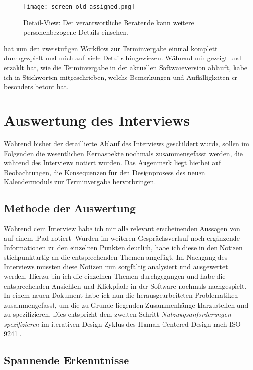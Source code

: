\begin{figure}[H]
    \caption{Detail-View: Der verantwortliche Beratende kann weitere personenbezogene Details einsehen.}
    \centering
    \texttt{[image: screen\_old\_assigned.png]}
\end{figure}

\ipName hat nun den zweistufigen Workflow zur Terminvergabe einmal komplett
durchgespielt und mich auf viele Details hingewiesen. Während \ipName mir
gezeigt und erzählt hat, wie die Terminvergabe in der aktuellen Softwareversion
abläuft, habe ich in Stichworten mitgeschrieben, welche Bemerkungen und
Auffälligkeiten er besonders betont hat.

\section{Auswertung des Interviews}

Während bisher der detaillierte Ablauf des Interviews geschildert wurde, sollen
im Folgenden die wesentlichen Kernaspekte nochmals zusammengefasst werden, die
während des Interviews notiert wurden. Das Augenmerk liegt hierbei auf
Beobachtungen, die Konsequenzen für den Designprozess des neuen Kalendermoduls
zur Terminvergabe hervorbringen.

\subsection*{Methode der Auswertung}
Während dem Interview habe ich mir alle relevant erscheinenden Aussagen von
\ipName auf einem iPad notiert. Wurden im weiteren Gesprächsverlauf noch
ergänzende Informationen zu den einzelnen Punkten deutlich, habe ich diese in
den Notizen stichpunktartig an die entsprechenden Themen angefügt. Im Nachgang
des Interviews mussten diese Notizen nun sorgfältig analysiert und ausgewertet
werden. Hierzu bin ich die einzelnen Themen durchgegangen und habe die
entsprechenden Ansichten und Klickpfade in der Software nochmals nachgespielt.
In einem neuen Dokument habe ich nun die herausgearbeiteten Problematiken
zusammengefasst, um die zu Grunde liegenden Zusammenhänge klarzustellen und zu
spezifizieren. Dies entspricht dem zweiten Schritt
\textit{Nutzungsanforderungen spezifizieren} im iterativen Design Zyklus des
Human Centered Design nach ISO 9241 \cite{ISO9241}.

\subsection*{Spannende Erkenntnisse}
\label{subsection:SpannendeErkenntnisse}

